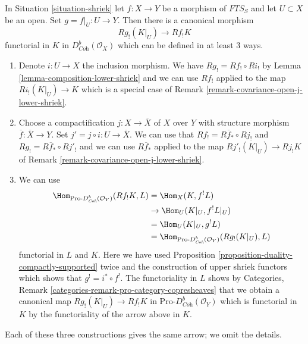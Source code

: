 \begin{remark}
\label{remark-covariance-open-lower-shriek}
In Situation \ref{situation-shriek} let $f : X \to Y$ be a morphism of
$\textit{FTS}_S$ and let $U \subset X$ be an open. Set
$g = f|_U : U \to Y$. Then there is a canonical morphism
$$
Rg_!(K|_U) \longrightarrow Rf_!K
$$
functorial in $K$ in $D^b_{\textit{Coh}}(\mathcal{O}_X)$
which can be defined in at least 3 ways.
\begin{enumerate}
\item Denote $i : U \to X$ the inclusion morphism. We have
$Rg_! = Rf_! \circ Ri_!$ by
Lemma \ref{lemma-composition-lower-shriek}
and we can use $Rf_!$ applied to the map $Ri_!(K|_U) \to K$
which is a special case of
Remark \ref{remark-covariance-open-j-lower-shriek}.
\item Choose a compactification $j : X \to \overline{X}$
of $X$ over $Y$ with structure morphism $\overline{f} : \overline{X} \to Y$.
Set $j' = j \circ i : U \to \overline{X}$. We can
use that $Rf_! = R\overline{f}_* \circ Rj_!$ and
$Rg_! = R\overline{f}_* \circ Rj'_!$
and we can use $R\overline{f}_*$ applied to the map
$Rj'_!(K|_U) \to Rj_!K$ of
Remark \ref{remark-covariance-open-j-lower-shriek}.
\item We can use
\begin{align*}
\Hom_{\text{Pro-}D^b_{\textit{Coh}}(\mathcal{O}_Y)}(Rf_!K, L)
& =
\Hom_X(K, f^!L) \\
& \to
\Hom_U(K|_U, f^!L|_U) \\
& =
\Hom_U(K|_U, g^!L) \\
& =
\Hom_{\text{Pro-}D^b_{\textit{Coh}}(\mathcal{O}_Y)}(Rg_!(K|_U), L)
\end{align*}
functorial in $L$ and $K$. Here we have used
Proposition \ref{proposition-duality-compactly-supported}
twice and the construction of upper shriek functors which
shows that $g^! = i^* \circ f^!$. The functoriality in $L$ shows by
Categories, Remark \ref{categories-remark-pro-category-copresheaves}
that we obtain a canonical map $Rg_!(K|_U) \to Rf_!K$ in
$\text{Pro-}D^b_{\textit{Coh}}(\mathcal{O}_Y)$ which is
functorial in $K$ by the functoriality of the arrow above in $K$.
\end{enumerate}
Each of these three constructions gives the same arrow; we omit the
details.
\end{remark}

